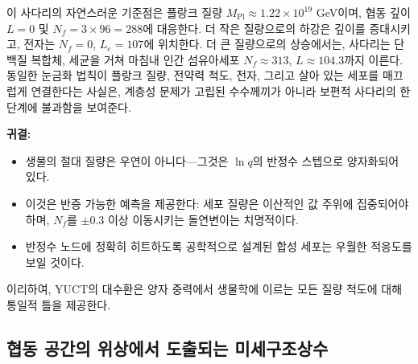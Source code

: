 \documentclass[12pt,a4paper]{article}
\begin{document}
	이 사다리의 자연스러운 기준점은 플랑크 질량 \(M_{\mathrm{Pl}} \approx 1.22 \times 10^{19}\) GeV이며, 협동 깊이 \(L = 0\) 및 \(N_f = 3 \times 96 = 288\)에 대응한다. 더 작은 질량으로의 하강은 깊이를 증대시키고, 전자는 \(N_f = 0\), \(L_e = 107\)에 위치한다. 더 큰 질량으로의 상승에서는, 사다리는 단백질 복합체, 세균을 거쳐 마침내 인간 섬유아세포 \(N_f \approx 313\), \(L \approx 104.3\)까지 이른다. 동일한 눈금화 법칙이 플랑크 질량, 전약력 척도, 전자, 그리고 살아 있는 세포를 매끄럽게 연결한다는 사실은, 계층성 문제가 고립된 수수께끼가 아니라 보편적 사다리의 한 단계에 불과함을 보여준다.
	
	\textbf{귀결:}
	\begin{itemize}
		\item 생물의 절대 질량은 우연이 아니다—그것은 \(\ln q\)의 반정수 스텝으로 양자화되어 있다.
		\item 이것은 반증 가능한 예측을 제공한다: 세포 질량은 이산적인 값 주위에 집중되어야 하며, \(N_f\)를 \(\pm0.3\) 이상 이동시키는 돌연변이는 치명적이다.
		\item 반정수 노드에 정확히 히트하도록 공학적으로 설계된 합성 세포는 우월한 적응도를 보일 것이다.
	\end{itemize}
	
	이리하여, YUCT의 대수환은 양자 중력에서 생물학에 이르는 모든 질량 척도에 대해 통일적 틀을 제공한다.
	
	\subsection{협동 공간의 위상에서 도출되는 미세구조상수}
	\label{subsec:alpha-topology}
	
\end{document}
